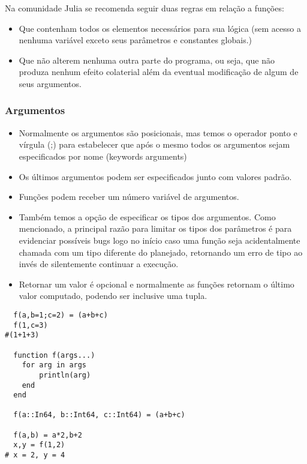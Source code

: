 Na comunidade Julia se recomenda seguir duas regras em relação a funções:%
\begin{itemize}
    \item Que contenham todos os elementos necessários para sua lógica (sem acesso a nenhuma variável exceto seus parâmetros e constantes globais.)
    \item Que não alterem nenhuma outra parte do programa, ou seja, que não produza nenhum efeito colaterial além da eventual modificação de algum de seus argumentos. 
\end{itemize}

\subsubsection{Argumentos}
\begin{itemize} %
    \item Normalmente os argumentos são posicionais, mas temos o operador ponto e vírgula (;) para estabelecer que após o mesmo todos os argumentos sejam especificados por nome (keywords arguments)
    \item Os últimos argumentos podem ser especificados junto com valores padrão.
    \item Funções podem receber um número variável de argumentos. 
    \item Também temos a opção de especificar os tipos dos argumentos. Como mencionado, a principal razão para limitar os tipos dos parâmetros é para evidenciar possíveis bugs logo no início caso uma função seja acidentalmente chamada com um tipo diferente do planejado, retornando um erro de tipo ao invés de silentemente continuar a execução.
    \item Retornar um valor é opcional e normalmente as funções retornam o último valor computado, podendo ser inclusive uma tupla.
\end{itemize}
\begin{lstlisting}
  f(a,b=1;c=2) = (a+b+c) 
  f(1,c=3) 
#(1+1+3)

  function f(args...)
  	for arg in args
  		println(arg)
  	end
  end

  f(a::In64, b::Int64, c::Int64) = (a+b+c)

  f(a,b) = a*2,b+2
  x,y = f(1,2) 
# x = 2, y = 4
    
\end{lstlisting}

